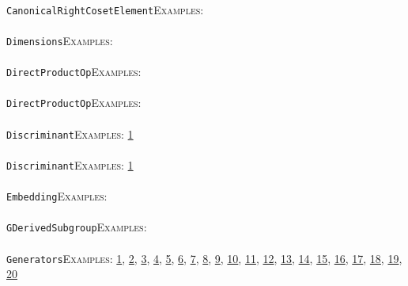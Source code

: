 \documentclass[a4paper,11pt]{report}
\begin{document}
{{ \\
 \texttt{CanonicalRightCosetElement}{\nobreakspace}{\nobreakspace}{\nobreakspace}{\nobreakspace}\textsc{Examples:} \\
 \\
 \texttt{Dimensions}{\nobreakspace}{\nobreakspace}{\nobreakspace}{\nobreakspace}\textsc{Examples:} \\
 \\
 \texttt{DirectProductOp}{\nobreakspace}{\nobreakspace}{\nobreakspace}{\nobreakspace}\textsc{Examples:} \\
 \\
 \texttt{DirectProductOp}{\nobreakspace}{\nobreakspace}{\nobreakspace}{\nobreakspace}\textsc{Examples:} \\
 \\
 \texttt{Discriminant}{\nobreakspace}{\nobreakspace}{\nobreakspace}{\nobreakspace}\textsc{Examples:} \href{tutorial/chap10.html} {1}{\nobreakspace} \\
 \\
 \texttt{Discriminant}{\nobreakspace}{\nobreakspace}{\nobreakspace}{\nobreakspace}\textsc{Examples:} \href{tutorial/chap10.html} {1}{\nobreakspace} \\
 \\
 \texttt{Embedding}{\nobreakspace}{\nobreakspace}{\nobreakspace}{\nobreakspace}\textsc{Examples:} \\
 \\
 \texttt{GDerivedSubgroup}{\nobreakspace}{\nobreakspace}{\nobreakspace}{\nobreakspace}\textsc{Examples:} \\
 \\
 \texttt{Generators}{\nobreakspace}{\nobreakspace}{\nobreakspace}{\nobreakspace}\textsc{Examples:} \href{tutorial/chap3.html} {1}{\nobreakspace}, \href{tutorial/chap7.html} {2}{\nobreakspace}, \href{tutorial/chap8.html} {3}{\nobreakspace}, \href{tutorial/chap10.html} {4}{\nobreakspace}, \href{../www/SideLinks/About/aboutModPRings.html} {5}{\nobreakspace}, \href{../www/SideLinks/About/aboutParallel.html} {6}{\nobreakspace}, \href{../www/SideLinks/About/aboutBredon.html} {7}{\nobreakspace}, \href{../www/SideLinks/About/aboutPerformance.html} {8}{\nobreakspace}, \href{../www/SideLinks/About/aboutPeriodic.html} {9}{\nobreakspace}, \href{../www/SideLinks/About/aboutCohomologyRings.html} {10}{\nobreakspace}, \href{../www/SideLinks/About/aboutCoveringSpaces.html} {11}{\nobreakspace}, \href{../www/SideLinks/About/aboutCoverinSpaces.html} {12}{\nobreakspace}, \href{../www/SideLinks/About/aboutRandomComplexes.html} {13}{\nobreakspace}, \href{../www/SideLinks/About/aboutExtensions.html} {14}{\nobreakspace}, \href{../www/SideLinks/About/aboutSpaceGroup.html} {15}{\nobreakspace}, \href{../www/SideLinks/About/aboutFunctorial.html} {16}{\nobreakspace}, \href{../www/SideLinks/About/aboutIntro.html} {17}{\nobreakspace}, \href{../www/SideLinks/About/aboutTopology.html} {18}{\nobreakspace}, \href{../www/SideLinks/About/aboutTorAndExt.html} {19}{\nobreakspace}, \href{../www/SideLinks/About/aboutTwistedCoefficients.html} {20}{\nobreakspace} \\
}}
\end{document}
